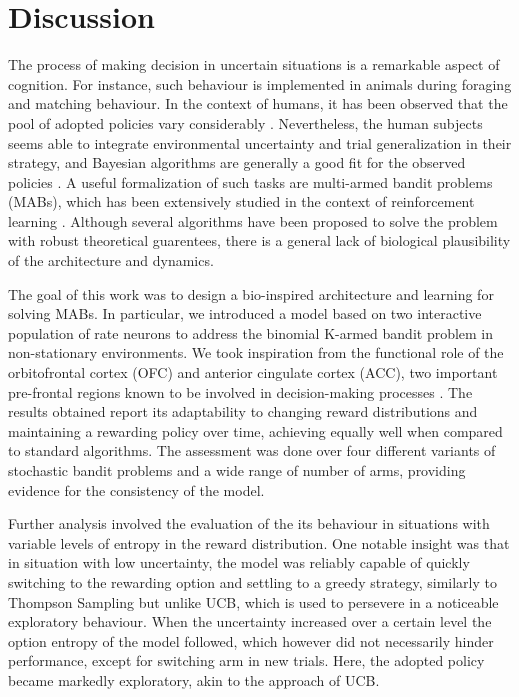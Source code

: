 
\section{Discussion}

The process of making decision in uncertain situations is a remarkable aspect of cognition. For instance, such behaviour is implemented in animals during foraging and matching behaviour.
In the context of humans, it has been observed that the pool of adopted policies vary considerably \cite{steyversBayesianAnalysisHuman2009a}.
Nevertheless, the human subjects seems able to integrate environmental uncertainty and trial generalization in their strategy, and Bayesian algorithms are generally a good fit for the observed policies \cite{schulzFindingStructureMultiarmed2020, zhangForgetfulBayesMyopic2013}.
A useful formalization of such tasks are multi-armed bandit problems (MABs), which has been extensively studied in the context of reinforcement learning \cite{suttonReinforcementLearningProblem1998}.
Although several algorithms have been proposed to solve the problem with robust theoretical guarentees, there is a general lack of biological plausibility of the architecture and dynamics.

%
The goal of this work was to design a bio-inspired architecture and learning for solving MABs. In particular, we introduced a model based on two interactive population of rate neurons to address the binomial K-armed bandit problem in non-stationary environments.
We took inspiration from the functional role of the orbitofrontal cortex (OFC) and anterior cingulate cortex (ACC), two important pre-frontal regions known to be involved in decision-making processes \cite{kennerleyDecisionMakingReward2011a, khamassiChapter22Medial2013}.
The results obtained report its adaptability to changing reward distributions and maintaining a rewarding policy over time, achieving equally well when compared to standard algorithms.
The assessment was done over four different variants of stochastic bandit problems and a wide range of number of arms, providing evidence for the consistency of the model.

Further analysis involved the evaluation of the its behaviour in situations with variable levels of entropy in the reward distribution.
One notable insight was that in situation with low uncertainty, the model was reliably capable of quickly switching to the rewarding option and settling to a greedy strategy, similarly to Thompson Sampling but unlike UCB, which is used to persevere in a noticeable exploratory behaviour.
When the uncertainty increased over a certain level the option entropy of the model followed, which however did not necessarily hinder performance, except for switching arm in new trials.
Here, the adopted policy became markedly exploratory, akin to the approach of UCB.

